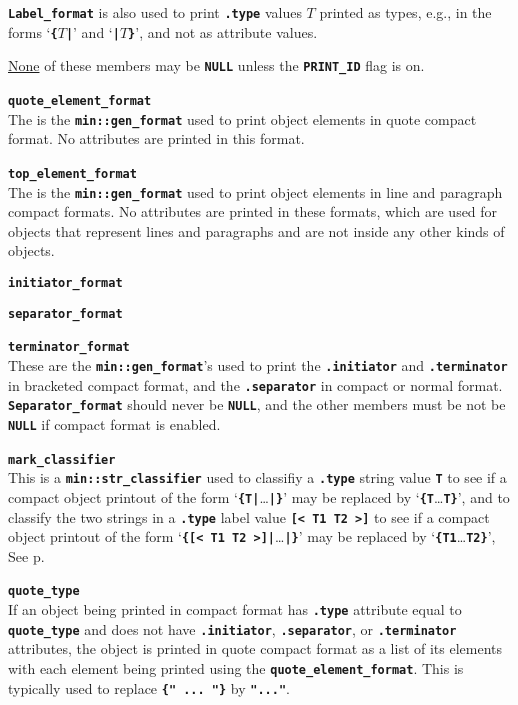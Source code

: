 \documentclass[12pt]{article}
\makeatletter
\newcommand{\TT}[1]{{\tt \bfseries #1}}
\newcommand{\ttmkey}[2]{\TT{#1}\index{#1@{\tt #1}!#2}}
\newcommand{\pagref}[1]{p\pageref{#1}}
\newcommand{\EOL}{\penalty \exhyphenpenalty}
\newenvironment{itemlist}[1][1.2in]%
	{\begin{list}{}{\setlength{\labelwidth}{#1}%
		        \setlength{\leftmargin}{\labelwidth}%
		        \addtolength{\leftmargin}{+0.2in}%
		        \renewcommand{\makelabel}[1]{##1\hfill}}}%
	{\end{list}}
\makeatother
\begin{document}
\begin{itemlist}[0.2in]
\TT{Label\_\EOL format} is also used to print \TT{.type} values $T$
printed as types, e.g., in the forms `\TT{\{$T$|}' and `\TT{|$T$\}}',
and not as attribute values.

\underline{None} of these members may be \TT{NULL} unless the
\TT{PRINT\_\EOL ID} flag is on.

\item[\ttmkey{quote\_element\_format}{in {\tt min::obj\_format}}]~\\
The is the \TT{min::gen\_format} used to print object elements
in quote compact format.  No attributes are printed in this format.

\item[\ttmkey{top\_element\_format}{in {\tt min::obj\_format}}]~\\
The is the \TT{min::gen\_format} used to print object elements
in line and paragraph compact formats.
No attributes are printed in these formats, which are used for
objects that represent lines and paragraphs and are not inside
any other kinds of objects.

\item[\ttmkey{initiator\_format}{in {\tt min::obj\_format}}]
\item[\ttmkey{separator\_format}{in {\tt min::obj\_format}}]\vspace{-2ex}
\item[\ttmkey{terminator\_format}{in {\tt min::obj\_format}}]\vspace{-2ex}~\\
These are the \TT{min::gen\_format}'s used to print the
\TT{.initiator} and \TT{.terminator} in bracketed compact
format, and the \TT{.separator} in compact or normal format.
\TT{Separator\_\EOL format} should never be \TT{NULL}, and the
other members must be not be \TT{NULL} if compact
format is enabled.

\item[\ttmkey{mark\_classifier}{in {\tt min::obj\_format}}]~\\
\label{MARK_CLASSIFIER}
This is a \TT{min::str\_classifier} used to classifiy
a \TT{.type} string value \TT{T} to see if
a compact object printout of the
form `\TT{\{T|}\ldots\TT{|\}}' may be replaced by `\TT{\{T}\ldots\TT{T\}}',
and to classify the two strings in a \TT{.type} label value \TT{[< T1 T2 >]}
to see if a compact object printout of the
form `\TT{\{[< T1 T2 >]|}\ldots\TT{|\}}' may be replaced by
`\TT{\{T1}\ldots\TT{T2\}}',
See \pagref{MARK_CLASSIFIER_USAGE}.

\item[\ttmkey{quote\_type}{in {\tt min::obj\_format}}]~\\
If an object being printed in compact format has \TT{.type} attribute
equal to \TT{quote\_\EOL type} and does not have
\TT{.initiator}, \TT{.separator}, or \TT{.terminator} attributes,
the object is printed in quote compact format
as a list of its elements with each element
being printed using the \TT{quote\_\EOL element\_\EOL format}.
This is typically used to replace \TT{\{"~...~"\}} by
\TT{"..."}.


\end{itemlist}
\end{document}
